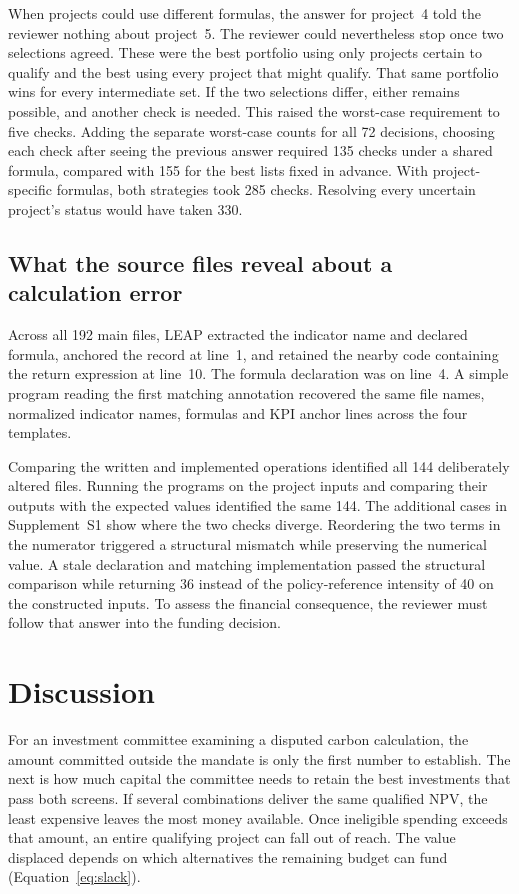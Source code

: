 When projects could use different formulas, the answer for project~4 told the reviewer nothing about project~5. The reviewer could nevertheless stop once two selections agreed. These were the best portfolio using only projects certain to qualify and the best using every project that might qualify. That same portfolio wins for every intermediate set. If the two selections differ, either remains possible, and another check is needed. This raised the worst-case requirement to five checks. Adding the separate worst-case counts for all 72 decisions, choosing each check after seeing the previous answer required 135 checks under a shared formula, compared with 155 for the best lists fixed in advance. With project-specific formulas, both strategies took 285 checks. Resolving every uncertain project's status would have taken 330.

\subsection{What the source files reveal about a calculation error}
Across all 192 main files, LEAP extracted the indicator name and declared formula, anchored the record at line~1, and retained the nearby code containing the return expression at line~10. The formula declaration was on line~4. A simple program reading the first matching annotation recovered the same file names, normalized indicator names, formulas and KPI anchor lines across the four templates.

Comparing the written and implemented operations identified all 144 deliberately altered files. Running the programs on the project inputs and comparing their outputs with the expected values identified the same 144. The additional cases in Supplement~S1 show where the two checks diverge. Reordering the two terms in the numerator triggered a structural mismatch while preserving the numerical value. A stale declaration and matching implementation passed the structural comparison while returning 36 instead of the policy-reference intensity of 40 on the constructed inputs. To assess the financial consequence, the reviewer must follow that answer into the funding decision.

\section{Discussion}
For an investment committee examining a disputed carbon calculation, the amount committed outside the mandate is only the first number to establish. The next is how much capital the committee needs to retain the best investments that pass both screens. If several combinations deliver the same qualified NPV, the least expensive leaves the most money available. Once ineligible spending exceeds that amount, an entire qualifying project can fall out of reach. The value displaced depends on which alternatives the remaining budget can fund (Equation~\eqref{eq:slack}).


